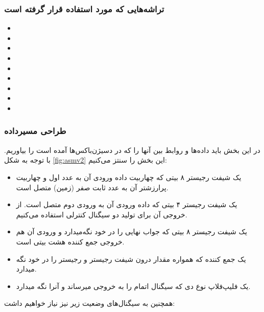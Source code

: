 \documentclass{article}
\begin{document}
\subsubsection{تراشه‌هایی که مورد استفاده قرار گرفته است}
\label{chips}
\begin{itemize}
\item[\lr{74283}]

\item[\lr{74194}]

\item[\lr{74198}]

\item[\lr{7474}]

\item[\lr{2732}]

\item[\lr{}]

\item[\lr{}]

\item[\lr{}]

\item[\lr{}]
\end{itemize}

\subsubsection{طراحی مسیرداده}
در این بخش باید داده‌ها و روابط بین آنها را که در دسیژن‌باکس‌ها آمده است را بیاوریم. با توجه به شکل \ref{fig:asmv2} این بخش را سنتز می‌کنیم:

\begin{itemize}
\item[\lr{A}]
یک شیفت رجیستر ۸ بیتی که چهاربیت داده ورودی آن به عدد اول و چهاربیت پرارزشتر آن به عدد ثابت صفر (زمین) متصل است.
\item[\lr{B}]
یک شیفت رجیستر ۴ بیتی که داده ورودی آن به ورودی دوم متصل است. از خروجی آن برای تولید دو سیگنال کنترلی استفاده می‌کنیم.
\item[\lr{C}]
یک شیفت رجیستر ۸ بیتی که جواب نهایی را در خود نگه‌میدارد و ورودی آن هم خروجی جمع کننده هشت بیتی است.
\item
یک جمع کننده که همواره مقدار درون شیفت رجیستر  و رجیستر  را در خود نگه میدارد.
\item[\lr{F}]
یک فلیپ‌فلاپ نوع دی که سیگنال اتمام را به خروجی میرساند و آنرا نگه میدارد.

\end{itemize}

همچنین به سیگنال‌های وضعیت زیر نیز نیاز خواهیم داشت:
\end{document}
